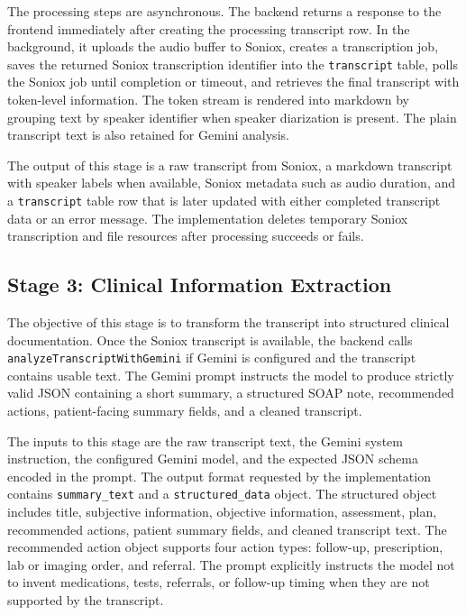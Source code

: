 The processing steps are asynchronous. The backend returns a response to the frontend immediately after creating the processing transcript row. In the background, it uploads the audio buffer to Soniox, creates a transcription job, saves the returned Soniox transcription identifier into the \texttt{transcript} table, polls the Soniox job until completion or timeout, and retrieves the final transcript with token-level information. The token stream is rendered into markdown by grouping text by speaker identifier when speaker diarization is present. The plain transcript text is also retained for Gemini analysis.

The output of this stage is a raw transcript from Soniox, a markdown transcript with speaker labels when available, Soniox metadata such as audio duration, and a \texttt{transcript} table row that is later updated with either completed transcript data or an error message. The implementation deletes temporary Soniox transcription and file resources after processing succeeds or fails.

\subsection{Stage 3: Clinical Information Extraction}
\label{subsec:stage-clinical-extraction}

The objective of this stage is to transform the transcript into structured clinical documentation. Once the Soniox transcript is available, the backend calls \texttt{analyzeTranscriptWithGemini} if Gemini is configured and the transcript contains usable text. The Gemini prompt instructs the model to produce strictly valid JSON containing a short summary, a structured SOAP note, recommended actions, patient-facing summary fields, and a cleaned transcript.

The inputs to this stage are the raw transcript text, the Gemini system instruction, the configured Gemini model, and the expected JSON schema encoded in the prompt. The output format requested by the implementation contains \texttt{summary\_text} and a \texttt{structured\_data} object. The structured object includes title, subjective information, objective information, assessment, plan, recommended actions, patient summary fields, and cleaned transcript text. The recommended action object supports four action types: follow-up, prescription, lab or imaging order, and referral. The prompt explicitly instructs the model not to invent medications, tests, referrals, or follow-up timing when they are not supported by the transcript.

